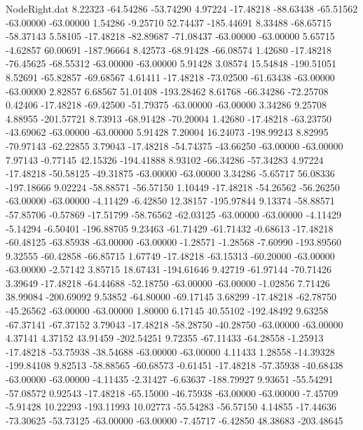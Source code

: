 \begin{filecontents}{NodeRight.dat}
   8.22323  -64.54286  -53.74290     4.97224  -17.48218  -88.63438  -65.51562  -63.00000  -63.00000    1.54286   -9.25710   52.74437 -185.44691
   8.33488  -68.65715  -58.37143     5.58105  -17.48218  -82.89687  -71.08437  -63.00000  -63.00000    5.65715   -4.62857   60.00691 -187.96664
   8.42573  -68.91428  -66.08574     1.42680  -17.48218  -76.45625  -68.55312  -63.00000  -63.00000    5.91428    3.08574   15.54848 -190.51051
   8.52691  -65.82857  -69.68567     4.61411  -17.48218  -73.02500  -61.63438  -63.00000  -63.00000    2.82857    6.68567   51.01408 -193.28462
   8.61768  -66.34286  -72.25708     0.42406  -17.48218  -69.42500  -51.79375  -63.00000  -63.00000    3.34286    9.25708    4.88955 -201.57721
   8.73913  -68.91428  -70.20004     1.42680  -17.48218  -63.23750  -43.69062  -63.00000  -63.00000    5.91428    7.20004   16.24073 -198.99243
   8.82995  -70.97143  -62.22855     3.79043  -17.48218  -54.74375  -43.66250  -63.00000  -63.00000    7.97143   -0.77145   42.15326 -194.41888
   8.93102  -66.34286  -57.34283     4.97224  -17.48218  -50.58125  -49.31875  -63.00000  -63.00000    3.34286   -5.65717   56.08336 -197.18666
   9.02224  -58.88571  -56.57150     1.10449  -17.48218  -54.26562  -56.26250  -63.00000  -63.00000   -4.11429   -6.42850   12.38157 -195.97844
   9.13374  -58.88571  -57.85706    -0.57869  -17.51799  -58.76562  -62.03125  -63.00000  -63.00000   -4.11429   -5.14294   -6.50401 -196.88705
   9.23463  -61.71429  -61.71432    -0.68613  -17.48218  -60.48125  -63.85938  -63.00000  -63.00000   -1.28571   -1.28568   -7.60990 -193.89560
   9.32555  -60.42858  -66.85715     1.67749  -17.48218  -63.15313  -60.20000  -63.00000  -63.00000   -2.57142    3.85715   18.67431 -194.61646
   9.42719  -61.97144  -70.71426     3.39649  -17.48218  -64.44688  -52.18750  -63.00000  -63.00000   -1.02856    7.71426   38.99084 -200.69092
   9.53852  -64.80000  -69.17145     3.68299  -17.48218  -62.78750  -45.26562  -63.00000  -63.00000    1.80000    6.17145   40.55102 -192.48492
   9.63258  -67.37141  -67.37152     3.79043  -17.48218  -58.28750  -40.28750  -63.00000  -63.00000    4.37141    4.37152   43.91459 -202.54251
   9.72355  -67.11433  -64.28558    -1.25913  -17.48218  -53.75938  -38.54688  -63.00000  -63.00000    4.11433    1.28558  -14.39328 -199.84108
   9.82513  -58.88565  -60.68573    -0.61451  -17.48218  -57.35938  -40.68438  -63.00000  -63.00000   -4.11435   -2.31427   -6.63637 -188.79927
   9.93651  -55.54291  -57.08572     0.92543  -17.48218  -65.15000  -46.75938  -63.00000  -63.00000   -7.45709   -5.91428   10.22293 -193.11993
  10.02773  -55.54283  -56.57150     4.14855  -17.44636  -73.30625  -53.73125  -63.00000  -63.00000   -7.45717   -6.42850   48.38683 -203.48645

\end{filecontents}
